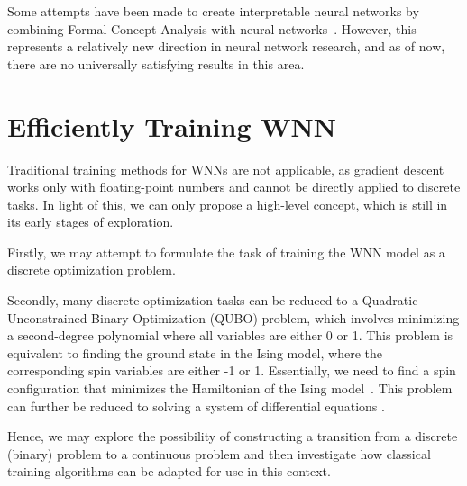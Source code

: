 \documentclass{article}[12pt]
\begin{document}
Some attempts have been made to create interpretable neural networks by combining Formal Concept Analysis with neural networks~\cite{parakal2022intrinsically, dudyrev2022human, kuznetsov2022pattern}.
However, this represents a relatively new direction in neural network research, and as of now, there are no universally satisfying results in this area.

\section{Efficiently Training WNN}\label{sec:training-wnn}
Traditional training methods for WNNs are not applicable, as gradient descent works only with floating-point numbers and cannot be directly applied to discrete tasks.
In light of this, we can only propose a high-level concept, which is still in its early stages of exploration.

Firstly, we may attempt to formulate the task of training the WNN model as a discrete optimization problem.

Secondly, many discrete optimization tasks can be reduced to a Quadratic Unconstrained Binary Optimization (QUBO) problem, which involves minimizing a second-degree polynomial where all variables are either 0 or 1.
This problem is equivalent to finding the ground state in the Ising model, where the corresponding spin variables are either -1 or 1.
Essentially, we need to find a spin configuration that minimizes the Hamiltonian of the Ising model~\cite{glover2018logical}.
This problem can further be reduced to solving a system of differential equations \cite{goto2019combinatorial, goto2021high}.

Hence, we may explore the possibility of constructing a transition from a discrete (binary) problem to a continuous problem and then investigate how classical training algorithms can be adapted for use in this context.


\newpage


\end{document}
